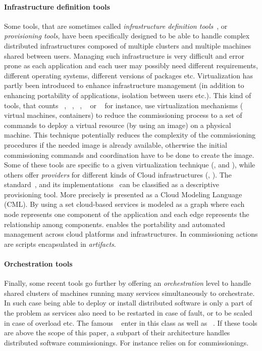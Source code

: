 \paragraph{Infrastructure definition tools}
Some tools, that are sometimes called \emph{infrastructure definition
  tools}~\cite{}, or \emph{provisioning tools}, have been specifically
designed to be able to handle complex distributed infrastructures
composed of multiple clusters and multiple machines shared between
users. Managing such infrastructure is very difficult and error prone
as each application and each user may possibly need different
requirements, different operating systems, different versions of
packages etc. Virtualization has partly been introduced to enhance
infrastructure management (in addition to enhancing portability of
applications, isolation between users etc.). This kind of tools, that
counts \docker~\cite{docker:web}, \terraform~\cite{terraform:web},
\juju~\cite{juju:web}, \cloudformation~\cite{cloudf:web} or
\heat~\cite{heat:web} for instance, use virtualization mechanisms (\eg
virtual machines, containers) to reduce the commissioning process to a
set of commands to deploy a virtual resource (by using an image) on a
physical machine. This technique potentially reduces the complexity of
the commissioning procedures if the needed image is already available,
otherwise the initial commissioning commands and coordination have to
be done to create the image. Some of these tools are specific to a
given virtualization technique (\eg \docker, \cloudformation and
\heat), while others offer \emph{providers} for different kinds of
Cloud infrastructures (\eg \terraform, \juju). The \tosca
standard~\cite{tosca:web}, and its
implementations~\cite{Binz2013,cloudify:web,opentosca:web,8599581} can
be classified as a descriptive provisioning tool. More precisely
\tosca is presented as a Cloud Modeling Language (CML). By using
\tosca a set cloud-based services is modeled as a graph where each
node represents one component of the application and each edge
represents the relationship among components. \tosca enables the
portability and automated management across cloud platforms and
infrastructures. In \tosca commissioning actions are scripts
encapsulated in \emph{artifacts}.

\paragraph{Orchestration tools}
Finally, some recent tools go further by offering an
\emph{orchestration} level to handle shared clusters of machines
running many services simultaneously to orchestrate. In such case
being able to deploy or install distributed software is only a part of
the problem as services also need to be restarted in case of fault, or
to be scaled in case of overload etc. The famous
\kubernetes~\cite{kubernetes:web} enter in this class as well as
\dockerswarm~\cite{dockerswarm:web}. If these tools are above the
scope of this paper, a subpart of their architecture handles
distributed software commissionings. For instance \kubernetes relies
on \docker for commissionings.

